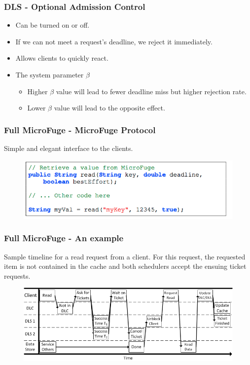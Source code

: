 \documentclass{beamer}
\begin{document}
\begin{frame}
\frametitle{DLS - Optional Admission Control}
\begin{itemize}
\item Can be turned on or off.
\item If we can not meet a request's deadline, we reject it immediately.
\item Allows clients to quickly react.
\item The system parameter $\beta$
\begin{itemize}
\item Higher $\beta$ value will lead to fewer deadline miss but higher rejection rate.
\item Lower $\beta$ value will lead to the opposite effect.
\end{itemize}
\end{itemize}
\end{frame}

\begin{frame}
\frametitle{Full MicroFuge - MicroFuge Protocol}
Simple and elegant interface to the clients.
  \begin{figure}
    \begin{center}
      \centerline{\includegraphics[scale=0.50]{img/MicroFuge_protocol.png}}
    \end{center}
  \end{figure}
\end{frame}

\begin{frame}
\frametitle{Full MicroFuge - An example}
Sample timeline for a read request from a client.
For this request, the requested item is not contained in the cache
and both schedulers accept the ensuing ticket requests.
  \begin{figure}
    \begin{center}
      \centerline{\includegraphics[scale=0.60]{img/RequestTimelineHorizontal.png}}
    \end{center}
  \end{figure}
\end{frame}
\end{document}

